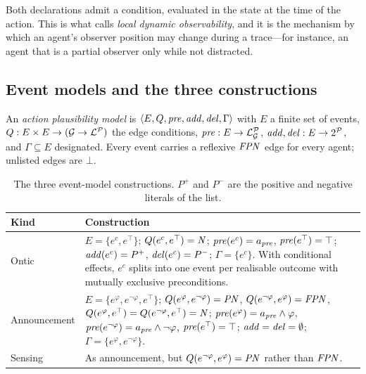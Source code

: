 \documentclass[11pt,a4paper]{article}
\begin{document}
Both declarations admit a condition, evaluated in the state at the time of the action. This is
what \citet{buckingham2021thesis} calls \emph{local dynamic observability}, and it is the
mechanism by which an agent's observer position may change during a trace---for instance, an
agent that is a partial observer only while not distracted.

\subsection{Event models and the three constructions}

\begin{definition}
An \emph{action plausibility model} is $\langle E, Q, \mathit{pre}, \mathit{add}, \mathit{del}, \Gamma\rangle$ with $E$
a finite set of events, $Q : E \times E \to (\mathcal{G} \to \mathcal{L}^{\mathcal{P}})$ the edge conditions,
$\mathit{pre} : E \to \mathcal{L}^{\mathcal{P}}_{\mathcal{G}}$, $\mathit{add}, \mathit{del} : E \to 2^{\mathcal{P}}$, and $\Gamma \subseteq E$ designated.
Every event carries a reflexive $\mathit{FPN}$ edge for every agent; unlisted edges are $\bot$.
\end{definition}

\begin{table}[t]
\centering
\small
\begin{tabular}{@{}lp{}@{}}
\toprule
\textbf{Kind} & \textbf{Construction} \\
\midrule
Ontic &
$E = \{e^{c}, e^{\top}\}$; $Q(e^{c},e^{\top}) = \mathit{N}$; $\mathit{pre}(e^{c}) = a_{\mathit{pre}}$,
$\mathit{pre}(e^{\top}) = \top$; $\mathit{add}(e^{c}) = P^{+}$, $\mathit{del}(e^{c}) = P^{-}$; $\Gamma = \{e^{c}\}$.
With conditional effects, $e^{c}$ splits into one event per realisable outcome with mutually
exclusive preconditions. \\[0.4em]
Announcement &
$E = \{e^{\varphi}, e^{\neg\varphi}, e^{\top}\}$;
$Q(e^{\varphi},e^{\neg\varphi}) = \mathit{PN}$, $Q(e^{\neg\varphi},e^{\varphi}) = \mathit{FPN}$,
$Q(e^{\varphi},e^{\top}) = Q(e^{\neg\varphi},e^{\top}) = \mathit{N}$;
$\mathit{pre}(e^{\varphi}) = a_{\mathit{pre}} \wedge \varphi$, $\mathit{pre}(e^{\neg\varphi}) = a_{\mathit{pre}} \wedge
\neg\varphi$, $\mathit{pre}(e^{\top}) = \top$; $\mathit{add} = \mathit{del} = \emptyset$;
$\Gamma = \{e^{\varphi}, e^{\neg\varphi}\}$. \\[0.4em]
Sensing &
As announcement, but $Q(e^{\neg\varphi},e^{\varphi}) = \mathit{PN}$ rather than $\mathit{FPN}$. \\
\bottomrule
\end{tabular}
\caption{The three event-model constructions. $P^{+}$ and $P^{-}$ are the positive and
negative literals of the  list.}
\label{tab:constructions}
\end{table}
\end{document}
